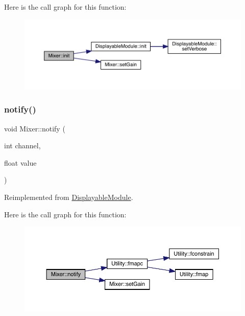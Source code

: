 Here is the call graph for this function\+:\nopagebreak
\begin{figure}[H]
\begin{center}
\leavevmode
\includegraphics[width=350pt]{class_mixer_ac6c290ada657f8325a59f37cafaf0c0c_cgraph}
\end{center}
\end{figure}
\mbox{\label{class_mixer_a73177ee1e071909ef23ff2e913eb6cbc}} 
\subsubsection{\texorpdfstring{notify()}{notify()}}
{\footnotesize\ttfamily void Mixer\+::notify (\begin{DoxyParamCaption}\item[{int}]{channel,  }\item[{float}]{value }\end{DoxyParamCaption})\hspace{0.3cm}{\ttfamily [virtual]}}



Reimplemented from \mbox{\hyperlink{class_displayable_module_a8ae5383931f10c54cff2feef2bc07dee}{Displayable\+Module}}.

Here is the call graph for this function\+:\nopagebreak
\begin{figure}[H]
\begin{center}
\leavevmode
\includegraphics[width=350pt]{class_mixer_a73177ee1e071909ef23ff2e913eb6cbc_cgraph}
\end{center}
\end{figure}
\mbox{\label{class_mixer_ab8ff46ce57c3c783de4cefbb6f86b1cc}} 
